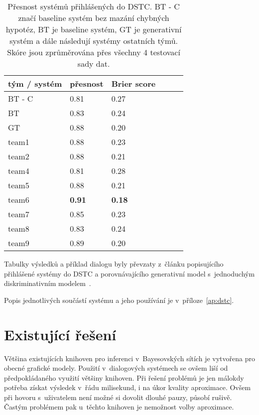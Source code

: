 \begin{table}[H]
\begin{center}
\begin{tabular}{|l|l|l|l|l|l|}
  \hline
tým / systém & přesnost & Brier score \\
\hline
BT - C         & 0.81 & 0.27\\
BT          & 0.83 & 0.24\\
GT          & 0.88 & 0.20\\
team1       & 0.88 & 0.23\\
team2       & 0.88 & 0.21\\
team4         & 0.81 & 0.28\\
team5         & 0.88 & 0.21\\
team6         & \textbf{0.91} & \textbf{0.18}\\
team7         & 0.85 & 0.23\\
team8         & 0.83 & 0.24\\
team9         & 0.89 & 0.20\\
\hline
\end{tabular}
\end{center}
\caption{Přesnost systémů přihlášených do DSTC. BT - C značí baseline systém bez mazání chybných hypotéz, BT je baseline systém, GT je generativní systém a dále následují systémy ostatních týmů. Skóre jsou zprůměrována přes všechny 4 testovací sady dat.}
\label{t:DSTC:ranking}
\end{table}

Tabulky výsledků a příklad dialogu byly převzaty z~článku popisujícího přihlášené systémy do DSTC a porovnávajícího generativní model s~jednoduchým diskriminativním modelem~\cite{zilka2013}.

Popis jednotlivých součástí systému a jeho používání je v~příloze~\ref{ap:dstc}.

\section{Existující řešení}

Většina existujících knihoven pro inferenci v~Bayesovských sítích je vytvořena pro obecné grafické modely.
Použití v~dialogových systémech se ovšem liší od předpokládaného využití většiny knihoven.
Při řešení problémů je jen málokdy potřeba získat výsledek v~řádu milisekund, i na úkor kvality aproximace.
Ovšem při hovoru s~uživatelem není možné si dovolit dlouhé pauzy, působí rušivě.
Častým problémem pak u~těchto knihoven je nemožnost volby aproximace.

